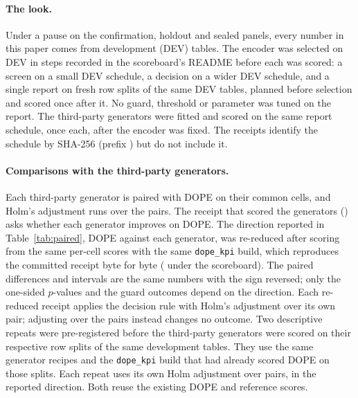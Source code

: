 \paragraph{The look.}
Under a pause on the confirmation, holdout and sealed panels, every number in this paper comes from development (DEV) tables.
The encoder was selected on DEV in steps recorded in the scoreboard's README before each was scored: a screen on a small DEV schedule, a decision on a wider DEV schedule, and a single report on fresh row splits of the same DEV tables, planned before selection and scored once after it.
No guard, threshold or parameter was tuned on the report.
The third-party generators were fitted and scored on the same report schedule, once each, after the encoder was fixed.
The receipts identify the schedule by SHA-256 (prefix \texttt{}) but do not include it.

\paragraph{Comparisons with the third-party generators.}
Each third-party generator is paired with DOPE on their common cells, and Holm's adjustment runs over the  pairs.
The receipt that scored the generators () asks whether each generator improves on DOPE.
The direction reported in Table~\ref{tab:paired}, DOPE against each generator, was re-reduced after scoring from the same per-cell scores with the same \texttt{dope\_kpi} build, which reproduces the committed receipt byte for byte ( under the scoreboard).
The paired differences and intervals are the same numbers with the sign reversed; only the one-sided $p$-values and the guard outcomes depend on the direction.
Each re-reduced receipt applies the decision rule with Holm's adjustment over its own pair; adjusting over the  pairs instead changes no outcome.
Two descriptive repeats were pre-registered before the third-party generators were scored on their respective row splits of the same development tables. They use the same generator recipes and the \texttt{dope\_kpi} build that had already scored DOPE on those splits. Each repeat uses its own Holm adjustment over  pairs, in the reported direction. Both reuse the existing DOPE and reference scores.
